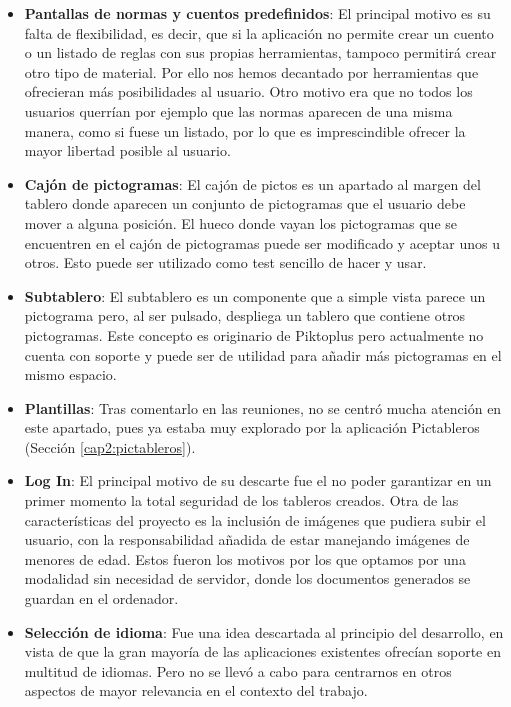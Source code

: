 \begin{itemize}
	\item\textbf{Pantallas de normas y cuentos predefinidos}: El principal motivo es su falta de flexibilidad, es decir, que si la aplicación no permite crear un cuento o un listado de reglas con sus propias herramientas, tampoco permitirá crear otro tipo de material. Por ello nos hemos decantado por herramientas que ofrecieran más posibilidades al usuario. Otro motivo era que no todos los usuarios querrían por ejemplo que las normas aparecen de una misma manera, como si fuese un listado, por lo que es imprescindible ofrecer la mayor libertad posible al usuario.
	
		
	\item \textbf{Cajón de pictogramas}: El cajón de pictos es un apartado al margen del tablero donde aparecen un conjunto de pictogramas que el usuario debe mover a alguna posición. El hueco donde vayan los pictogramas que se encuentren en el cajón de pictogramas puede ser modificado y aceptar unos u otros. Esto puede ser utilizado como test sencillo de hacer y usar.
	
	\item \textbf{Subtablero}: El subtablero es un componente que a simple vista parece un pictograma pero, al ser pulsado, despliega un tablero que contiene otros pictogramas. Este concepto es originario de Piktoplus pero actualmente no cuenta con soporte y puede ser de utilidad para añadir más pictogramas en el mismo espacio.
	
	\item \textbf{Plantillas}: Tras comentarlo en las reuniones, no se centró mucha atención en este apartado, pues ya estaba muy explorado por la aplicación Pictableros (Sección \ref{cap2:pictableros}).
	
	\item \textbf{Log In}: El principal motivo de su descarte fue el no poder garantizar en un primer momento la total seguridad de los tableros creados.
	Otra de las características del proyecto es la inclusión de imágenes que pudiera subir el usuario, con la responsabilidad añadida de estar manejando imágenes de menores de edad. Estos fueron los motivos por los que optamos por una modalidad sin necesidad de servidor, donde los documentos generados se guardan en el ordenador.
	
	\item \textbf{Selección de idioma}: Fue una idea descartada al principio del desarrollo, en vista de que la gran mayoría de las aplicaciones existentes ofrecían soporte en multitud de idiomas. Pero no se llevó a cabo para centrarnos en otros aspectos de mayor relevancia en el contexto del trabajo.
	
\end{itemize}


